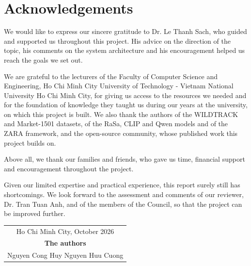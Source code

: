 \chapter*{Acknowledgements}

We would like to express our sincere gratitude to Dr. Le Thanh Sach, who guided and supported us throughout this project. His advice on the direction of the topic, his comments on the system architecture and his encouragement helped us reach the goals we set out.

We are grateful to the lecturers of the Faculty of Computer Science and Engineering, Ho Chi Minh City University of Technology - Vietnam National University Ho Chi Minh City, for giving us access to the resources we needed and for the foundation of knowledge they taught us during our years at the university, on which this project is built. We also thank the authors of the WILDTRACK and Market-1501 datasets, of the RaSa, CLIP and Qwen models and of the ZARA framework, and the open-source community, whose published work this project builds on.

Above all, we thank our families and friends, who gave us time, financial support and encouragement throughout the project.

Given our limited expertise and practical experience, this report surely still has shortcomings. We look forward to the assessment and comments of our reviewer, Dr. Tran Tuan Anh, and of the members of the Council, so that the project can be improved further.

\vspace{1cm}
\begin{flushright}
\begin{tabular}{c}
    Ho Chi Minh City, October 2026 \\
    \textbf{The authors} \\[0.3cm]
    Nguyen Cong Huy \quad Nguyen Huu Cuong
\end{tabular}
\end{flushright}
